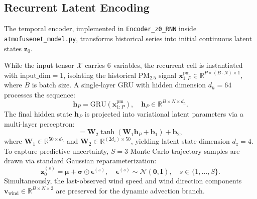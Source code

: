\documentclass[conference]{IEEEtran}
\begin{document}
\subsection{Recurrent Latent Encoding}
The temporal encoder, implemented in \texttt{Encoder\_z0\_RNN} inside \texttt{atmofusenet\_model.py}, transforms historical series into initial continuous latent states $\boldsymbol{z}_0$. 

While the input tensor $\boldsymbol{\mathcal{X}}$ carries 6 variables, the recurrent cell is instantiated with $\text{input\_dim} = 1$, isolating the historical $\text{PM}_{2.5}$ signal $\boldsymbol{x}^{\text{pm}}_{1:P} \in \mathbb{R}^{P \times (B \cdot N) \times 1}$, where $B$ is batch size. A single-layer GRU with hidden dimension $d_h = 64$ processes the sequence:
\begin{equation}
\boldsymbol{h}_P = \mathrm{GRU}(\boldsymbol{x}^{\text{pm}}_{1:P}), \quad \boldsymbol{h}_P \in \mathbb{R}^{B \times N \times d_h}.
\label{eq:gru}
\end{equation}
The final hidden state $\boldsymbol{h}_P$ is projected into variational latent parameters via a multi-layer perceptron:
\begin{equation}
[\boldsymbol{\mu}, \log \boldsymbol{\sigma}] = \boldsymbol{W}_2 \tanh(\boldsymbol{W}_1 \boldsymbol{h}_P + \boldsymbol{b}_1) + \boldsymbol{b}_2,
\label{eq:mlp_latent}
\end{equation}
where $\boldsymbol{W}_1 \in \mathbb{R}^{50 \times d_h}$ and $\boldsymbol{W}_2 \in \mathbb{R}^{(2 d_z) \times 50}$, yielding latent state dimension $d_z = 4$. To capture predictive uncertainty, $S = 3$ Monte Carlo trajectory samples are drawn via standard Gaussian reparameterization:
\begin{equation}
\boldsymbol{z}_0^{(s)} = \boldsymbol{\mu} + \boldsymbol{\sigma} \odot \boldsymbol{\epsilon}^{(s)}, \quad \boldsymbol{\epsilon}^{(s)} \sim \mathcal{N}(\mathbf{0}, \boldsymbol{I}), \quad s \in \{1, \dots, S\}.
\label{eq:reparam}
\end{equation}
Simultaneously, the last-observed wind speed and wind direction components $\boldsymbol{v}_{\text{wind}} \in \mathbb{R}^{B \times N \times 2}$ are preserved for the dynamic advection branch.
\end{document}
